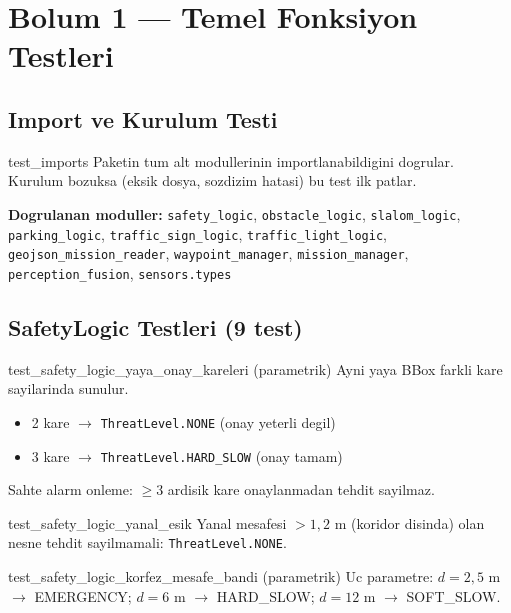 \documentclass[a4paper,12pt]{article}
\begin{document}
\section{Bolum 1 --- Temel Fonksiyon Testleri}

\subsection{Import ve Kurulum Testi}

\begin{testbox}{test\_imports}
Paketin tum alt modullerinin importlanabildigini dogrular.
Kurulum bozuksa (eksik dosya, sozdizim hatasi) bu test ilk patlar.

\smallskip
\textbf{Dogrulanan moduller:}
\texttt{safety\_logic}, \texttt{obstacle\_logic}, \texttt{slalom\_logic},
\texttt{parking\_logic}, \texttt{traffic\_sign\_logic},
\texttt{traffic\_light\_logic}, \texttt{geojson\_mission\_reader},
\texttt{waypoint\_manager}, \texttt{mission\_manager},
\texttt{perception\_fusion}, \texttt{sensors.types}
\end{testbox}

\subsection{SafetyLogic Testleri (9 test)}

\begin{testbox}{test\_safety\_logic\_yaya\_onay\_kareleri (parametrik)}
Ayni yaya BBox farkli kare sayilarinda sunulur.
\begin{itemize}
  \item 2 kare $\to$ \texttt{ThreatLevel.NONE} (onay yeterli degil)
  \item 3 kare $\to$ \texttt{ThreatLevel.HARD\_SLOW} (onay tamam)
\end{itemize}
\begin{specbox}
Sahte alarm onleme: $\geq 3$ ardisik kare onaylanmadan tehdit sayilmaz.
\end{specbox}
\end{testbox}

\begin{testbox}{test\_safety\_logic\_yanal\_esik}
Yanal mesafesi $> 1{,}2$ m (koridor disinda) olan nesne tehdit
sayilmamali: \texttt{ThreatLevel.NONE}.
\end{testbox}

\begin{testbox}{test\_safety\_logic\_korfez\_mesafe\_bandi (parametrik)}
Uc parametre: $d = 2{,}5$ m $\to$ EMERGENCY; $d = 6$ m $\to$ HARD\_SLOW;
$d = 12$ m $\to$ SOFT\_SLOW.
\end{testbox}
\end{document}
